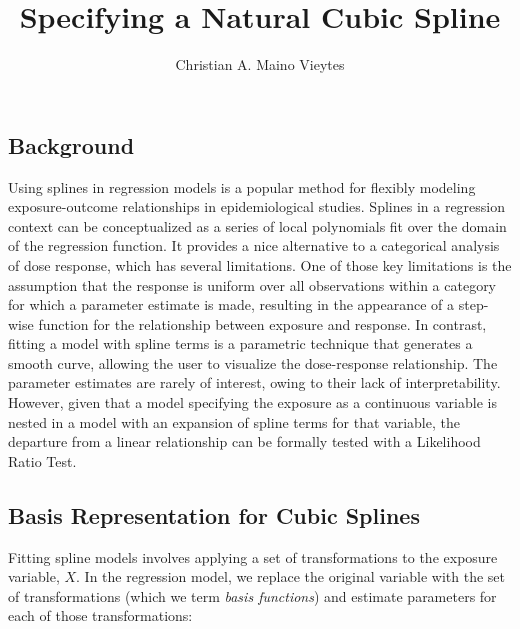 \documentclass{article}
\title{Specifying a Natural Cubic Spline}
\author{Christian A. Maino Vieytes}
\date{}
\begin{document}
\maketitle
{}

\subsection*{\textbf{Background}} %
\hspace{\parindent} Using splines in regression models is a popular method for flexibly modeling exposure-outcome relationships in epidemiological studies. \supercite{greenland_dose-response_1995, witte_nested_1997} Splines in a regression context can be conceptualized as a series of local polynomials fit over the domain of the regression function. It provides a nice alternative to a categorical analysis of dose response, which has several limitations. One of those key limitations is the assumption that the response is uniform over all observations within a category for which a parameter estimate is made, resulting in the appearance of a step-wise function for the relationship between exposure and response. \supercite{steenland_practical_2004} In contrast, fitting a model with spline terms is a parametric technique that generates a smooth curve, allowing the user to visualize the dose-response relationship. The parameter estimates are rarely of interest, owing to their lack of interpretability. \supercite{steenland_practical_2004} However, given that a model specifying the exposure as a continuous variable is nested in a model with an expansion of spline terms for that variable, the departure from a linear relationship can be formally tested with a Likelihood Ratio Test.\supercite{witte_nested_1997}

\vspace{0.5cm} %
\subsection*{\textbf{Basis Representation for Cubic Splines}} %
\hspace{\parindent} Fitting spline models involves applying a set of transformations to the exposure variable, $X$. In the regression model, we replace the original variable with the set of transformations (which we term \textit{basis functions}) and estimate parameters for each of those transformations:
\end{document}
